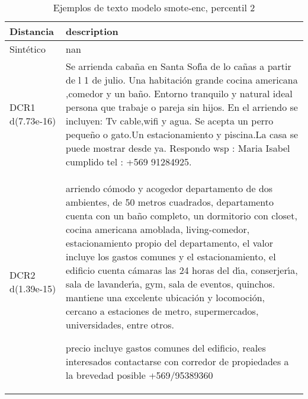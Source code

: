 \begin{table}[H]
\centering
\fontsize{10}{14}\selectfont
\caption{Ejemplos de texto modelo smote-enc, percentil 2}
\label{table-example-economicos-b-3-smote-enc-2p-text}
\begin{tabular}{|l|m{35em}|}
\hline
\rowcolor[gray]{0.8}
Distancia & description \\
\hline Sintético & nan \\
\hline DCR1 d(7.73e-16) & Se arrienda caba\~na en Santa Sof{\'\i}a de lo ca\~nas a partir de l 1 de julio. Una habitaci\'on grande cocina americana ,comedor y un ba\~no. Entorno tranquilo y natural ideal persona que trabaje o pareja sin hijos. En el arriendo se incluyen: Tv cable,wifi y agua. Se acepta un perro peque\~no o gato.Un estacionamiento y piscina.La casa se puede mostrar desde ya. Respondo wsp : Maria Isabel cumplido tel : +569 91284925. \\
\hline DCR2 d(1.39e-15) & arriendo c\'omodo y acogedor departamento de dos ambientes, de 50 metros cuadrados, departamento cuenta con un ba\~no completo, un dormitorio con closet, cocina americana amoblada, living-comedor, estacionamiento propio del departamento, el valor incluye los gastos comunes y el estacionamiento, el edificio cuenta c\'amaras las 24 horas del d{\'\i}a, conserjer{\'\i}a, sala de lavander{\'\i}a, gym, sala de eventos, quinchos. mantiene una excelente ubicaci\'on y locomoci\'on, cercano a estaciones de metro, supermercados, universidades, entre otros.

precio incluye gastos comunes del edificio, reales interesados contactarse con corredor de propiedades a la brevedad posible +569/95389360 \\
\hline
\end{tabular}
\end{table}
